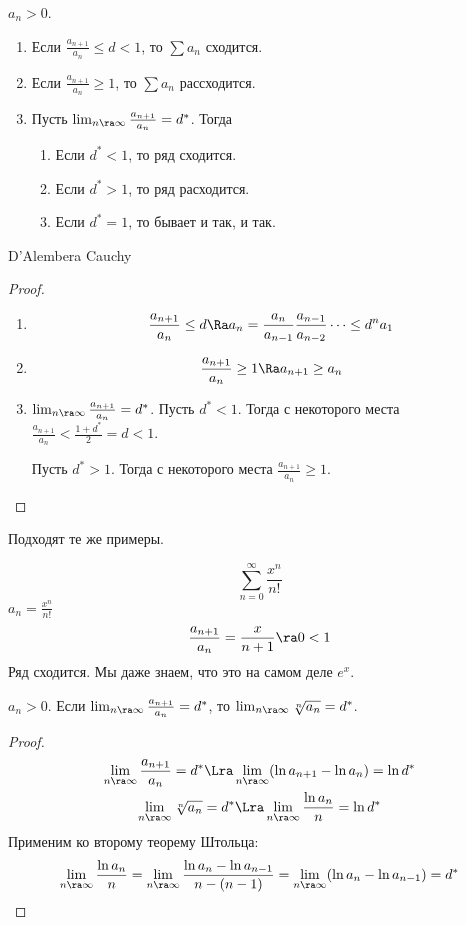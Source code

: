\begin{theorem}
	$a_n > 0$.
	\begin{enumerate}
	\item
		Если $\frac{a_{n+1}}{a_n} \le d < 1$, то $\sum a_n$ сходится.

	\item
		Если $\frac{a_{n+1}}{a_n} \ge 1$, то $\sum a_n$ рассходится.

	\item
		Пусть $\lim_{n\ra\infty} \frac{a_{n+1}}{a_n} = d^*$.
		Тогда
		\begin{enumerate}
			\item Если $d^* < 1$, то ряд сходится.
			\item Если $d^* > 1$, то ряд расходится.
			\item Если $d^* = 1$, то бывает и так, и так.
		\end{enumerate}
	\end{enumerate}
\end{theorem}
\begin{Rem}
	D'Alembera Cauchy
\end{Rem}
\begin{proof}
	\begin{enumerate}
	\item
		\[ \frac{a_{n+1}}{a_n} \le d \Ra a_n = \frac{a_n}{a_{n-1}}\frac{a_{n-1}}{a_{n-2}} \dots \le d^n a_1 \]

	\item
		\[ \frac{a_{n+1}}{a_n} \ge 1 \Ra a_{n+1} \ge a_n \]
		
	\item
		$\lim_{n\ra\infty} \frac{a_{n+1}}{a_n} = d^*$.
		Пусть $d^* < 1$.
		Тогда с некоторого места $\frac{a_{n+1}}{a_n} < \frac{1+d^*}2 = d < 1$.

		Пусть $d^* > 1$.
		Тогда с некоторого места $\frac{a_{n+1}}{a_n} \ge 1$. 
	\end{enumerate}
\end{proof}
\begin{Rem}
	Подходят те же примеры.
\end{Rem}
\begin{exmp}
	\[ \sum_{n=0}^\infty \frac{x^n}{n!} \]
	$a_n = \frac{x^n}{n!}$
	\[ \frac{a_{n+1}}{a_n} = \frac{x}{n+1} \ra 0 < 1 \]
	Ряд сходится.
	Мы даже знаем, что это на самом деле $e^x$.
\end{exmp}

\begin{theorem}
	$a_n > 0$.
	Если $\lim_{n\ra\infty} \frac{a_{n+1}}{a_n} = d^*$, то $\lim_{n\ra\infty} \sqrt[n]{a_n} = d^*$.
\end{theorem}
\begin{proof}
	\begin{gather*}
		\lim_{n\ra\infty} \frac{a_{n+1}}{a_n} = d^* \Lra \lim_{n\ra\infty} (\ln a_{n+1} - \ln a_n) = \ln d^* \\
		\lim_{n\ra\infty} \sqrt[n]{a_n} = d^* \Lra \lim_{n\ra\infty} \frac{\ln a_n}n = \ln d^*
	\end{gather*}
	Применим ко второму теорему Штольца:
	\[
		\lim_{n\ra\infty} \frac{\ln a_n}n
		= \lim_{n\ra\infty} \frac{\ln a_n - \ln a_{n-1}}{n - (n - 1)}
		= \lim_{n\ra\infty} (\ln a_n - \ln a_{n-1})
		= d^* 
	\]
\end{proof}


